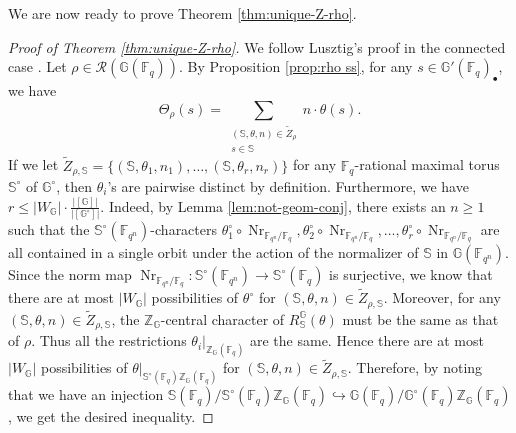 \documentclass{amsart}
\newcommand{\F}{\mathbb{F}}
\newcommand{\FF}{\mathbb{F}}
\newcommand{\bbS}{\mathbb{S}}
\newcommand{\bbG}{\mathbb{G}}
\newcommand{\bbZ}{\mathbb{Z}}
\newcommand{\cR}{\mathcal{R}}
\DeclareMathOperator{\Nr}{Nr}
\theoremstyle{plain}
\theoremstyle{definition}
\theoremstyle{remark}
\theoremstyle{theorem}
\begin{document}
We are now ready to prove Theorem \ref{thm:unique-Z-rho}.

\begin{proof}[Proof of Theorem \ref{thm:unique-Z-rho}]
We follow Lusztig's proof in the connected case \cite{Lus20}.
Let $\rho \in \cR(\bbG(\FF_q))$.
By Proposition \ref{prop:rho ss}, for any $s \in \bbG'(\F_{q})_{\bullet}$, we have
\[
\Theta_{\rho}(s)
=
\sum_{\substack{(\bbS,\theta,n) \in \tilde Z_\rho \\ s \in \bbS}} n \cdot \theta(s).
\]
If we let $\tilde{Z}_{\rho,\bbS}=\{(\bbS,\theta_{1},n_{1}),\ldots,(\bbS,\theta_{r},n_{r})\}$ for any $\F_{q}$-rational maximal torus $\bbS^{\circ}$ of $\bbG^{\circ}$, then $\theta_{i}$'s are pairwise distinct by definition. 
Furthermore, we have $r \leq |W_{\bbG}|\cdot\frac{|[\bbG]|}{|[\bbG^{\circ}]|}$. 
Indeed, by Lemma \ref{lem:not-geom-conj}, there exists an $n \geq 1$ such that the $\bbS^{\circ}(\FF_{q^n})$-characters $\theta_1^{\circ} \circ \Nr_{\F_{q^{n}}/\F_{q}}, \theta_2^{\circ} \circ \Nr_{\F_{q^{n}}/\F_{q}}, \ldots, \theta_r^{\circ} \circ \Nr_{\F_{q^{n}}/\F_{q}}$ are all contained in a single orbit under the action of the normalizer of $\bbS$ in $\bbG(\FF_{q^n})$. 
Since the norm map $\Nr_{\F_{q^{n}}/\F_{q}}\colon\bbS^{\circ}(\F_{q^{n}})\rightarrow\bbS^{\circ}(\F_{q})$ is surjective, we know that there are at most $|W_{\bbG}|$ possibilities of $\theta^{\circ}$ for $(\bbS,\theta,n)\in \tilde{Z}_{\rho,\bbS}$.
Moreover, for any $(\bbS,\theta,n)\in \tilde{Z}_{\rho,\bbS}$, the $\bbZ_{\bbG}$-central character of $R_{\bbS}^{\bbG}(\theta)$ must be the same as that of $\rho$.
Thus all the restrictions $\theta_{i}|_{\bbZ_{\bbG}(\F_{q})}$ are the same.
Hence there are at most $|W_{\bbG}|$ possibilities of $\theta|_{\bbS^{\circ}(\F_{q})\bbZ_{\bbG}(\F_{q})}$ for $(\bbS,\theta,n)\in \tilde{Z}_{\rho,\bbS}$.
Therefore, by noting that we have an injection $\bbS(\F_{q})/\bbS^{\circ}(\F_{q})\bbZ_{\bbG}(\F_{q})\hookrightarrow\bbG(\F_{q})/\bbG^{\circ}(\F_{q})\bbZ_{\bbG}(\F_{q})$, we get the desired inequality.


\end{proof}
\end{document}
